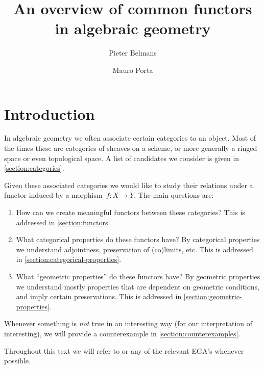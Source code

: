 \documentclass[a4paper,10pt]{article}
\title{An overview of common functors in algebraic geometry}
\author{Pieter Belmans \and Mauro Porta}
\theoremstyle{definition}
\begin{document}
\maketitle

\listoftodos

\section{Introduction}
In algebraic geometry we often associate certain categories to an object. Most of the times these are categories of sheaves on a scheme, or more generally a ringed space or even topological space. A list of candidates we consider is given in \cref{section:categories}.

Given these associated categories we would like to study their relations under a functor induced by a morphism~$f\colon X\to Y$. The main questions are:
\begin{enumerate}
  \item How can we create meaningful functors between these categories? This is addressed in \cref{section:functors}.
  \item What categorical properties do these functors have? By categorical properties we understand adjointness, preservation of (co)limits, etc. This is addressed in \cref{section:categorical-properties}.
  \item What ``geometric properties'' do these functors have? By geometric properties we understand mostly properties that are dependent on geometric conditions, and imply certain preservations. This is addressed in \cref{section:geometric-properties}.
\end{enumerate}
Whenever something is \emph{not} true in an interesting way (for our interpretation of interesting), we will provide a counterexample in \cref{section:counterexamples}.

Throughout this text we will refer to \cite{stacks} or any of the relevant EGA's whenever possible.
\end{document}
